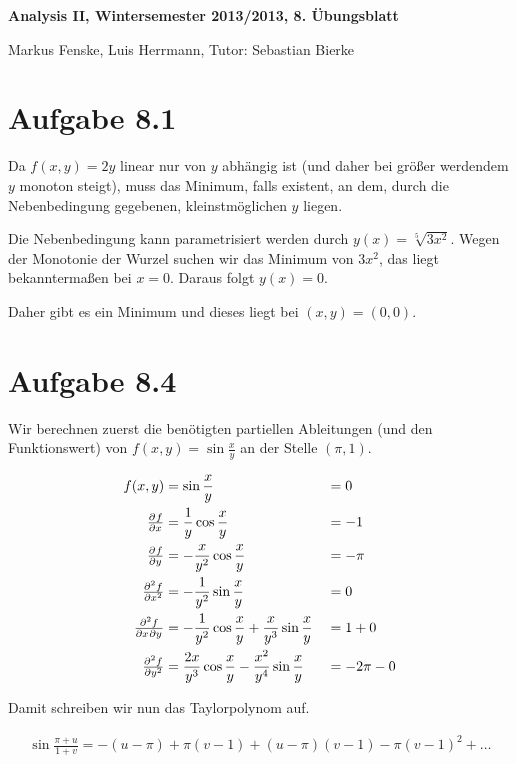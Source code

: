 \documentclass[a4paper,german,12pt,smallheadings]{scrartcl}
\begin{document}
\begin{center}
\bfseries %
\sffamily %
\vspace{-40pt}
Analysis II, Wintersemester 2013/2013, 8. Übungsblatt

Markus Fenske, Luis Herrmann, Tutor: Sebastian Bierke
\vspace{-10pt}
\end{center}
\allowdisplaybreaks %
\section*{Aufgabe 8.1}
Da $f(x,y) = 2y$ linear nur von $y$ abhängig ist (und daher bei größer
werdendem $y$ monoton steigt), muss das Minimum, falls existent, an dem, durch
die Nebenbedingung gegebenen, kleinstmöglichen $y$ liegen.

Die Nebenbedingung kann parametrisiert werden durch $y(x) = \sqrt[5]{3x^2}$.
Wegen der Monotonie der Wurzel suchen wir das Minimum von $3x^2$, das liegt
bekanntermaßen bei $x=0$. Daraus folgt $y(x) = 0$.

Daher gibt es ein Minimum und dieses liegt bei $(x,y) = (0,0)$.
\section*{Aufgabe 8.4}

Wir berechnen zuerst die benötigten partiellen Ableitungen (und den
Funktionswert) von $f(x,y) = \sin \frac{x}{y}$ an der Stelle $(\pi,1)$.

\begin{align*}
  f(x,y)              &=                  \sin \frac{x}{y}                                    &&= 0          \\
  \pd{f}{x}           &=  \frac{1}{y}     \cos \frac{x}{y}                                    &&= -1         \\
  \pd{f}{y}           &= -\frac{x}{y^2}   \cos \frac{x}{y}                                    &&= - \pi      \\
  \pd[2]{f}{x}        &= - \frac{1}{y^2}  \sin \frac{x}{y}                                    &&= 0          \\
  \md{f}{2}{x}{}{y}{} &= -\frac{1}{y^2}   \cos \frac{x}{y} + \frac{x}{y^3}   \sin \frac{x}{y} &&= 1 + 0      \\
  \pd[2]{f}{y}        &=  \frac{2x}{y^3}  \cos \frac{x}{y} - \frac{x^2}{y^4} \sin \frac{x}{y} &&= -2 \pi - 0 \\
\end{align*}

Damit schreiben wir nun das Taylorpolynom auf.

\begin{align*}
  \sin \frac{\pi + u}{1 + v} = -(u - \pi) + \pi(v-1) + (u-\pi)(v-1) - \pi (v-1)^2 + \dots
\end{align*}
\end{document}
